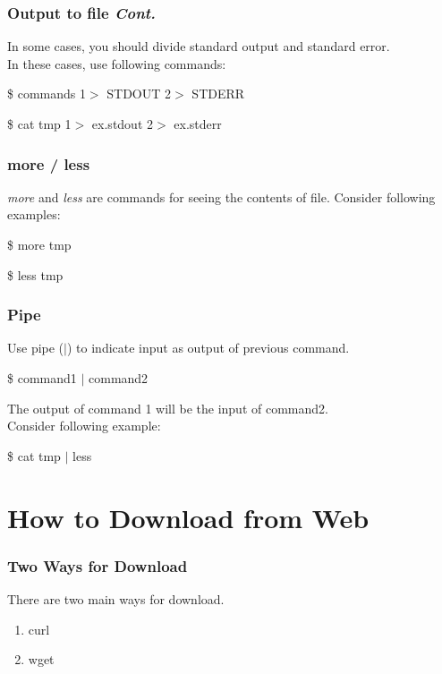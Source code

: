 \documentclass{beamer}
\begin{document}
	\begin{frame}
		\frametitle{Output to file \textit{Cont.}}
		In some cases, you should divide standard output and standard error. \\
		In these cases, use following commands:
		\begin{example}
			\$ commands 1$>$ STDOUT 2$>$ STDERR
		\end{example}
	
		\begin{example}
			\$ cat tmp 1$>$ ex.stdout 2$>$ ex.stderr 
		\end{example}
	\end{frame}

	\begin{frame}
		\frametitle{more / less}
		\textit{more} and \textit{less} are commands for seeing the contents of file.
		Consider following examples:
		\begin{example}
			\$ more tmp
		\end{example}
	
		\begin{example}
			\$ less tmp
		\end{example}
	\end{frame}

	\begin{frame}
		\frametitle{Pipe}
		Use pipe ($|$) to indicate input as output of previous command.
		\begin{example}
			\$ command1 $|$ command2
		\end{example}
		The output of command 1 will be the input of command2. \\
		Consider following example: 
		\begin{example}
			\$ cat tmp $|$ less
		\end{example}
	\end{frame}
	
	\section{How to Download from Web}
	
	\begin{frame}
		\frametitle{Two Ways for Download}
		There are two main ways for download.
		\begin{enumerate}
			\item curl
			\item wget
		\end{enumerate}
	\end{frame}
\end{document}

